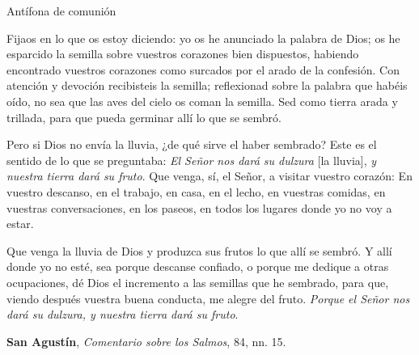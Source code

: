 \begin{liturgiabox}{Antífona de comunión }
\begin{liturgiatext}
		\newpage 
		
		Fijaos en lo que os estoy diciendo: yo os he anunciado la palabra de Dios; os he esparcido la semilla sobre vuestros corazones bien dispuestos, habiendo encontrado vuestros corazones como surcados por el arado de la confesión. Con atención y devoción recibisteis la semilla; reflexionad sobre la palabra que habéis oído, no sea que las aves del cielo os coman la semilla. Sed como tierra arada y trillada, para que pueda germinar allí lo que se sembró. 
		
		Pero si Dios no envía la lluvia, ¿de qué sirve el haber sembrado? Este es el sentido de lo que se preguntaba: \emph{El Señor nos dará su dulzura} [la lluvia], \emph{y nuestra tierra dará su fruto}. Que venga, sí, el Señor, a visitar vuestro corazón: En vuestro descanso, en el trabajo, en casa, en el lecho, en vuestras comidas, en vuestras conversaciones, en los paseos, en todos los lugares donde yo no voy a estar. 
		
		Que venga la lluvia de Dios y produzca sus frutos lo que allí se sembró. Y allí donde yo no esté, sea porque descanse confiado, o porque me dedique a otras ocupaciones, dé Dios el incremento a las semillas que he sembrado, para que, viendo después vuestra buena conducta, me alegre del fruto. \emph{Porque el Señor nos dará su dulzura, y nuestra tierra dará su fruto}.
		
		\textbf{San Agustín}, \emph{Comentario sobre los Salmos}, 84, nn. 15.
	\end{liturgiatext}
	
\end{liturgiabox}	


\newpage

